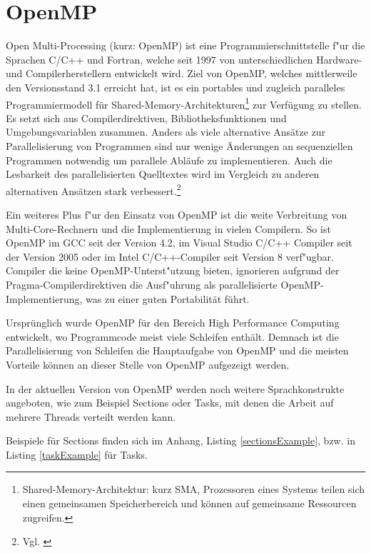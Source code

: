 \documentclass[11pt]{scrartcl}
\begin{document}
\pagebreak

\pagestyle{fancy}
\setcounter{page}{1} 

\section{OpenMP} Open Multi-Processing (kurz: OpenMP) ist eine Programmierschnittstelle
f"ur die Sprachen C/C++ und Fortran, welche seit 1997 von unterschiedlichen Hardware- und Compilerherstellern entwickelt wird. Ziel von OpenMP, welches mittlerweile den Versionsstand 3.1 erreicht hat, ist es ein portables und zugleich paralleles Programmiermodell für Shared-Memory-Architekturen\footnote{Shared-Memory-Architektur: kurz SMA, Prozessoren eines Systems teilen sich einen gemeinsamen Speicherbereich und können auf gemeinsame Ressourcen zugreifen.} zur Verfügung zu stellen. Es setzt sich aus Compilerdirektiven, Bibliotheksfunktionen und Umgebungsvariablen zusammen. Anders als viele alternative Ansätze zur Parallelisierung von Programmen sind nur wenige Änderungen an sequenziellen Programmen notwendig um parallele Abläufe zu implementieren. Auch die Lesbarkeit des parallelisierten Quelltextes wird im Vergleich zu anderen alternativen Ansätzen stark verbessert.\footnote{Vgl. \cite{openmp08} }

Ein weiteres Plus f"ur den Einsatz von OpenMP ist die weite Verbreitung von Multi-Core-Rechnern und die Implementierung in vielen Compilern. So ist OpenMP im GCC seit der Version 4.2, im Visual Studio C/C++ Compiler seit der Version 2005 oder im Intel C/C++-Compiler seit Version 8 verf"ugbar. Compiler die keine OpenMP-Unterst"utzung bieten, ignorieren aufgrund der Pragma-Compilerdirektiven die Ausf"uhrung als parallelisierte OpenMP-Implementierung, was zu einer guten Portabilität führt.

Ursprünglich wurde OpenMP für den Bereich High Performance Computing entwickelt, wo Programmcode meist viele Schleifen enthält. Demnach ist die Parallelisierung von Schleifen die Hauptaufgabe von OpenMP und die meisten Vorteile können an dieser Stelle von OpenMP aufgezeigt werden. 

In der aktuellen Version von OpenMP werden noch weitere Sprachkonstrukte angeboten, wie zum Beispiel Sections oder Tasks, mit denen die Arbeit auf mehrere Threads verteilt werden kann.

Beispiele für Sections finden sich im Anhang, Listing \ref{sectionsExample}, bzw. in Listing \ref{taskExample} für Tasks. 
\end{document}

